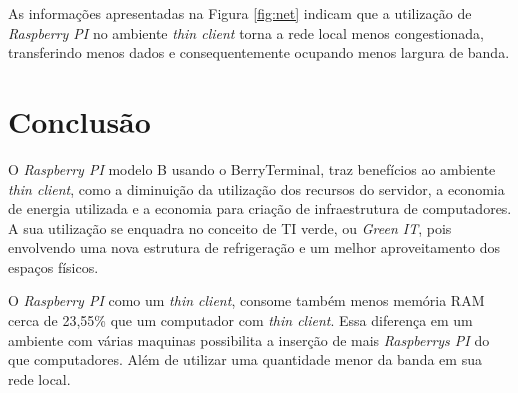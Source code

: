 \documentclass[
	12pt,				%
	openright,			%
	twoside,			%
	a4paper,			%
	chapter=TITLE,		%
	english,			%
	brazil				%
	]{abntex2}
\begin{document}
As informações apresentadas na Figura \ref{fig:net} indicam que a utilização de \textit{Raspberry PI} no ambiente \textit{thin client} torna a rede local menos congestionada, transferindo menos dados e consequentemente ocupando menos largura de banda. 









\section{Conclusão}

O \textit{Raspberry PI} modelo B usando o BerryTerminal, traz benefícios ao ambiente \textit{thin client}, como a diminuição da utilização dos recursos do servidor, a economia de energia utilizada e a economia para criação de infraestrutura de computadores. A sua utilização se enquadra no conceito de TI verde, ou \textit{Green IT}, pois envolvendo uma nova estrutura de refrigeração e um melhor aproveitamento dos espaços físicos. 

O \textit{Raspberry PI} como um \textit{thin client}, consome também menos memória RAM cerca de 23,55\% que um computador com \textit{thin client}. Essa diferença em um ambiente com várias maquinas possibilita a inserção de mais \textit{Raspberrys PI} do que computadores. Além de utilizar uma quantidade menor da banda em sua rede local.
\end{document}
